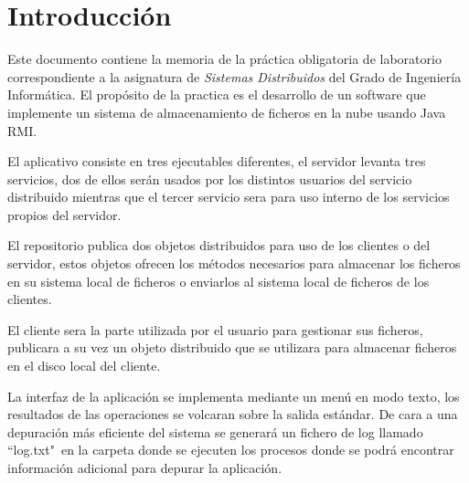 
\chapter{Introducción}

Este documento contiene la memoria de la práctica obligatoria de laboratorio correspondiente a la asignatura de \emph{Sistemas Distribuidos} del Grado de Ingeniería Informática. El propósito de la practica es el desarrollo de un software que implemente un sistema de almacenamiento de ficheros en la nube usando Java RMI.

El aplicativo consiste en tres ejecutables diferentes, el servidor levanta tres servicios, dos de ellos serán usados por los distintos usuarios del servicio distribuido mientras que el tercer servicio sera para uso interno de los servicios propios del servidor.

El repositorio publica dos objetos distribuidos para uso de los clientes o del servidor, estos objetos ofrecen los métodos necesarios para almacenar los ficheros en su sistema local de ficheros o enviarlos al sistema local de ficheros de los clientes.

El cliente sera la parte utilizada por el usuario para gestionar sus ficheros, publicara a su vez un objeto distribuido que se utilizara para almacenar ficheros en el disco local del cliente.

La interfaz de la aplicación se implementa mediante un menú en modo texto, los resultados de las operaciones se volcaran sobre la salida estándar. De cara a una depuración más eficiente del sistema se generará un fichero de log llamado ``log.txt"\ en la carpeta donde se ejecuten los procesos donde se podrá encontrar información adicional para depurar la aplicación.

